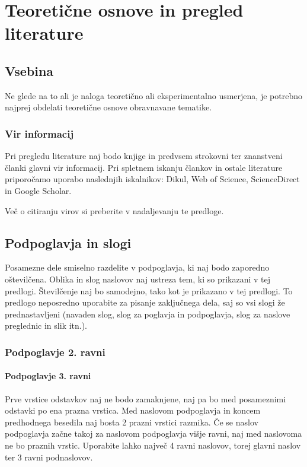 \chapter{Teoretične osnove in pregled literature}\label{cha:teoreticne_osnove}

\section{Vsebina}\label{sec:vsebina}
Ne glede na to ali je naloga teoretično ali eksperimentalno usmerjena, je 
potrebno najprej obdelati teoretične osnove obravnavane tematike.

\subsection{Vir informacij}\label{sec:vir_informacij}
Pri pregledu literature naj bodo knjige in predvsem strokovni ter znanstveni 
članki glavni vir informacij. Pri spletnem iskanju člankov in ostale literature 
priporočamo uporabo naslednjih iskalnikov: Dikul, Web of Science, ScienceDirect 
in Google Scholar.

Več o citiranju virov si preberite v nadaljevanju te predloge.

\section{Podpoglavja in slogi}\label{sec:podpoglavja}
Posamezne dele smiselno razdelite v podpoglavja, ki naj bodo zaporedno 
oštevilčena. Oblika in slog naslovov naj ustreza tem, ki so prikazani v tej 
predlogi. Številčenje naj bo samodejno, tako kot je prikazano v tej predlogi. 
To predlogo neposredno uporabite za pisanje zaključnega dela, saj so vsi slogi 
že prednastavljeni (navaden slog, slog za poglavja in podpoglavja, slog za 
naslove preglednic in slik itn.).

\subsection{Podpoglavje 2. ravni}\label{sec:poglavje_2}
\subsubsection{Podpoglavje 3. ravni}\label{sec:poglavje_3}

Prve vrstice odstavkov naj ne bodo zamaknjene, naj pa bo med posameznimi 
odstavki po ena prazna vrstica. Med naslovom podpoglavja in koncem predhodnega 
besedila naj bosta 2 prazni vrstici razmika. Če se naslov podpoglavja začne 
takoj za naslovom podpoglavja višje ravni, naj med naslovoma ne bo praznih 
vrstic. Uporabite lahko največ 4 ravni naslovov, torej glavni naslov ter 3 
ravni podnaslovov.

